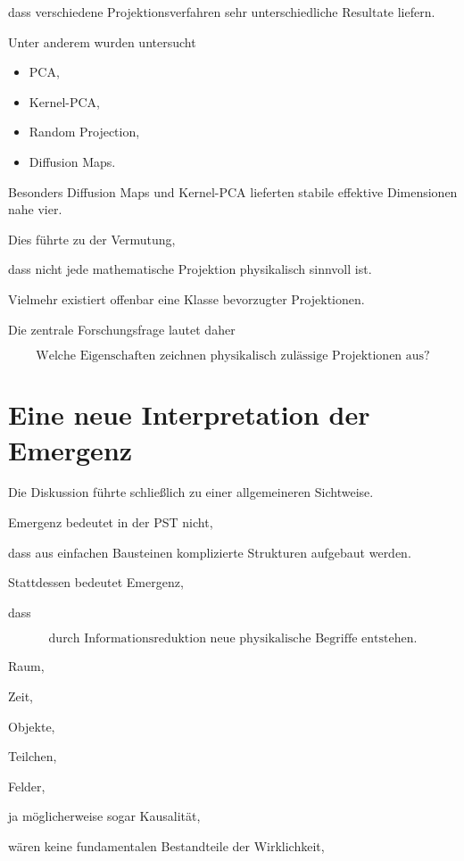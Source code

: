 dass verschiedene Projektionsverfahren sehr unterschiedliche Resultate liefern.

Unter anderem wurden untersucht

\begin{itemize}

\item PCA,

\item Kernel-PCA,

\item Random Projection,

\item Diffusion Maps.

\end{itemize}

Besonders Diffusion Maps und Kernel-PCA lieferten stabile effektive Dimensionen nahe vier.

Dies führte zu der Vermutung,

dass nicht jede mathematische Projektion physikalisch sinnvoll ist.

Vielmehr existiert offenbar eine Klasse bevorzugter Projektionen.

Die zentrale Forschungsfrage lautet daher

\[
\boxed{
\text{Welche Eigenschaften zeichnen physikalisch zulässige Projektionen aus?}
}
\]

\section*{Eine neue Interpretation der Emergenz}

Die Diskussion führte schließlich zu einer allgemeineren Sichtweise.

Emergenz bedeutet in der PST nicht,

dass aus einfachen Bausteinen komplizierte Strukturen aufgebaut werden.

Stattdessen bedeutet Emergenz,

dass

\[
\boxed{
\text{durch Informationsreduktion neue physikalische Begriffe entstehen.}
}
\]

Raum,

Zeit,

Objekte,

Teilchen,

Felder,

ja möglicherweise sogar Kausalität,

wären keine fundamentalen Bestandteile der Wirklichkeit,

